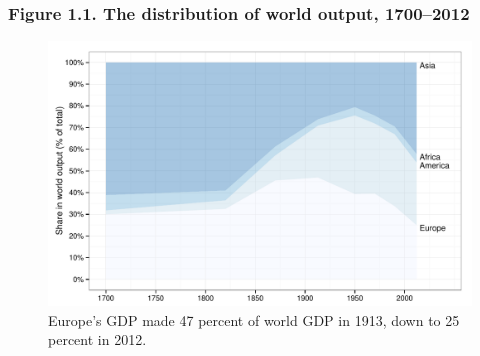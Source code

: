 \documentclass[t]{beamer}\usepackage[]{graphicx}\usepackage[]{color}
\newenvironment{knitrout}{}{} %
\begin{document}
\begin{frame}[label=Figure_1_1]
\frametitle{Figure 1.1. The distribution of world output, 1700--2012}
\begin{figure}[t]
\begin{minipage}[b]{\textwidth}
\centering
\begin{knitrout}\footnotesize
{}\color{fgcolor}

{\centering \includegraphics[width=1\linewidth]{figures/color/Figure_1_1} 

}



\end{knitrout}
\caption{Europe's GDP made 47 percent of world GDP in 1913, down to 25 percent in 2012.}
\end{minipage}
\end{figure}
\end{frame}
\end{document}
